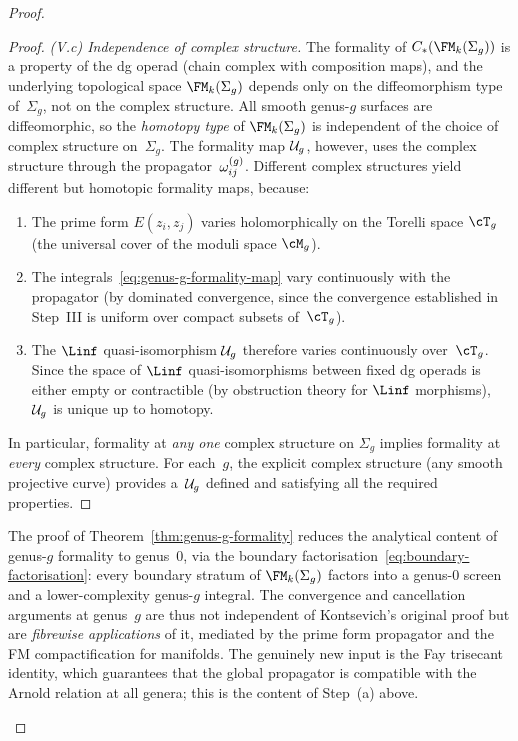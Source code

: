 \begin{proof}
\begin{proof}
\medskip\noindent
\emph{(V.c) Independence of complex structure.}
The formality of $C_\ast(\FMg{k})$ is a property of the
dg operad (chain complex with composition maps), and the
underlying topological space $\FMg{k}$ depends only on the
diffeomorphism type of~$\Sigma_g$, not on the complex
structure. All smooth genus-$g$ surfaces are diffeomorphic,
so the \emph{homotopy type} of $\FMg{k}$ is independent of
the choice of complex structure on~$\Sigma_g$. The formality
map $\mathcal{U}_g$, however, uses the complex structure through the
propagator~$\omega^{(g)}_{ij}$. Different complex structures yield
different but homotopic formality maps, because:
\begin{enumerate}[label=\textup{(\arabic*)}]
\item The prime form $E(z_i, z_j)$ varies holomorphically on
 the Torelli space $\cT_g$ (the universal cover of the moduli
 space $\cM_g$).
\item The integrals~\eqref{eq:genus-g-formality-map} vary
 continuously with the propagator (by dominated convergence,
 since the convergence established in Step~III is uniform over
 compact subsets of~$\cT_g$).
\item The $\Linf$ quasi-isomorphism $\mathcal{U}_g$ therefore varies
 continuously over~$\cT_g$. Since the space of $\Linf$
 quasi-isomorphisms between fixed dg operads is either empty
 or contractible (by obstruction theory for $\Linf$ morphisms),
 $\mathcal{U}_g$ is unique up to homotopy.
\end{enumerate}
In particular, formality at \emph{any one} complex structure
on $\Sigma_g$ implies formality at \emph{every} complex
structure. For each~$g$, the explicit complex structure (any
smooth projective curve) provides a~$\mathcal{U}_g$ defined and
satisfying all the required properties.
\end{proof}

\begin{remark}
\label{rem:genus-g-formality-range}
The proof of Theorem~\ref{thm:genus-g-formality} reduces the
analytical content of genus-$g$ formality to genus~$0$, via the
boundary factorisation~\eqref{eq:boundary-factorisation}:
every boundary stratum of $\FMg{k}$ factors into a genus-$0$
screen and a lower-complexity genus-$g$ integral. The
convergence and cancellation arguments at genus~$g$ are thus
not independent of Kontsevich's original proof but are
\emph{fibrewise applications} of it, mediated by the prime form
propagator and the FM compactification for manifolds. The
genuinely new input is the Fay trisecant identity, which
guarantees that the global propagator is compatible with the
Arnold relation at all genera; this is the content of
Step~(a) above.
\end{remark}


\end{proof}

